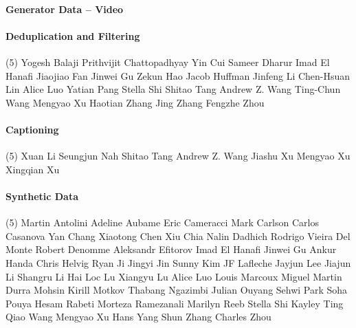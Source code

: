 \paragraph{Generator Data -- Video} \mbox{}
\vspace{-0.32\baselineskip}\paragraph{\footnotesize Deduplication and Filtering} \mbox{}
\vspace{-0.32\baselineskip}
\begingroup
\footnotesize
\begin{tasks}[label=\relax, label-width=0pt, item-indent=4pt](5)
\task Yogesh Balaji
\task Prithvijit Chattopadhyay
\task Yin Cui
\task Sameer Dharur
\task Imad El Hanafi
\task Jiaojiao Fan
\task Jinwei Gu
\task Zekun Hao
\task Jacob Huffman
\task Jinfeng Li
\task Chen-Hsuan Lin
\task Alice Luo
\task Yatian Pang
\task Stella Shi
\task Shitao Tang
\task Andrew Z. Wang
\task Ting-Chun Wang
\task Mengyao Xu
\task Haotian Zhang
\task Jing Zhang
\task Fengzhe Zhou
\end{tasks}
\endgroup

\vspace{-0.32\baselineskip}\paragraph{\footnotesize Captioning} \mbox{}
\vspace{-0.32\baselineskip}
\begingroup
\footnotesize
\begin{tasks}[label=\relax, label-width=0pt, item-indent=4pt](5)
\task Xuan Li
\task Seungjun Nah
\task Shitao Tang
\task Andrew Z. Wang
\task Jiashu Xu
\task Mengyao Xu
\task Xingqian Xu
\end{tasks}
\endgroup

\vspace{-0.32\baselineskip}\paragraph{\footnotesize Synthetic Data} \mbox{}
\vspace{-0.32\baselineskip}
\begingroup
\footnotesize
\begin{tasks}[label=\relax, label-width=0pt, item-indent=4pt](5)
\task Martin Antolini 
\task Adeline Aubame 
\task Eric Cameracci 
\task Mark Carlson 
\task Carlos Casanova 
\task Yan Chang 
\task Xiaotong Chen 
\task Xiu Chia 
\task Nalin Dadhich 
\task Rodrigo Vieira Del Monte 
\task Robert Denomme 
\task Aleksandr Efitorov 
\task Imad El Hanafi
\task Jinwei Gu 
\task Ankur Handa 
\task Chris Helvig 
\task Ryan Ji 
\task Jingyi Jin 
\task Sunny Kim 
\task JF Lafleche 
\task Jayjun Lee 
\task Jiajun Li 
\task Shangru Li 
\task Hai Loc Lu 
\task Xiangyu Lu 
\task Alice Luo
\task Louis Marcoux 
\task Miguel Martin 
\task Durra Mohsin 
\task Kirill Motkov 
\task Thabang Ngazimbi 
\task Julian Ouyang 
\task Sehwi Park 
\task Soha Pouya 
\task Hesam Rabeti 
\task Morteza Ramezanali 
\task Marilyn Reeb 
\task Stella Shi
\task Kayley Ting 
\task Qiao Wang 
\task Mengyao Xu
\task Hans Yang 
\task Shun Zhang 
\task Charles Zhou 
\end{tasks}
\endgroup

